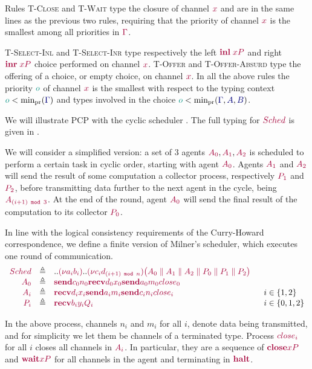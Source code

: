 \documentclass[main.tex]{subfiles}
\begin{document}
Rules \textsc{T-Close} and \textsc{T-Wait} type the closure of channel $\tm x$ and are in the same lines as the previous two rules, requiring that the priority of channel $\tm x$ is the smallest among all priorities in $\tm\Gamma$.

\textsc{T-Select-Inl} and \textsc{T-Select-Inr} type respectively the left $\tm{\inl{x}{P}}$ and right $\tm{\inr{x}{P}}$ choice performed on channel $\tm x$. \textsc{T-Offer} and \textsc{T-Offer-Absurd} type the offering of a choice, or empty choice, on channel $\tm x$. In all the above rules the priority $\cs o$ of channel $\tm x$ is the smallest with respect to the typing context $\cs{o}<\minpr(\ty{\Gamma})$ and types involved in the choice $\cs{o}<\minpr(\ty{\Gamma},\ty{A},\ty{B})$.


\begin{example}
  We will illustrate PCP with the cyclic scheduler \cite{milner99}. The full typing for $\tm {Sched}$ is given in \cite{dardha2018}.

  We will consider a simplified version: a set of 3 agents $\tm {A_0}, \tm {A_1}, \tm {A_2}$ is scheduled to perform a certain task in cyclic order, starting with agent $\tm {A_0}$. Agents $\tm {A_1}$ and $\tm {A_2}$ will send the result of some computation a collector process, respectively $\tm {P_1}$ and $\tm {P_2}$, before transmitting data further to the next agent in the cycle, being $\tm {A_{(i+1)\texttt{ mod } 3}}$. At the end of the round, agent $\tm {A_0}$ will send the final result of the computation to its collector $\tm {P_0}$.

  In line with the logical consistency requirements of the Curry-Howard correspondence, we define a finite version of Milner's scheduler, which executes one round of communication.
  $$
    \begin{array}{rcll}
      \tm {Sched} & \defeq & ..\tm {(\nu {a_i}{b_i})}..\tm {(\nu {c_i}{d_{{(i+1)\texttt{ mod } n}}})} \tm {\big(A_0 \parallel A_1 \parallel A_2 \parallel P_0 \parallel P_1 \parallel P_2 \big)}\\
      \tm{A_0} & \defeq & \tm{\send{c_0}{n_0}{\recv{d_0}{x_0}{\send{a_0}{m_0}{close_0}}}}\\
      \tm{A_i} & \defeq & \tm{\recv{d_i}{x_i}{\send{a_i}{m_i}{\send{c_i}{n_i}{close_i}}}} &~~ i \in \{1,2\}\\
      \tm {P_i} & \defeq & \tm{\recv{b_i}{y_i}{Q_i}} &~~ i \in \{0,1,2\}
    \end{array}
  $$

  In the above process, channels $n_i$ and $m_i$ for all $i$, denote data being transmitted, and for simplicity we let them be channels of a terminated type. Process $\tm{close_i}$ for all $i$ closes all channels in $\tm{A_i}$. In particular, they are a sequence of $\tm{\close{x}{P}}$ and $\tm{\wait{x}{P}}$ for all channels in the agent and terminating in $\tm{\halt}$.
\end{example}
\end{document}
